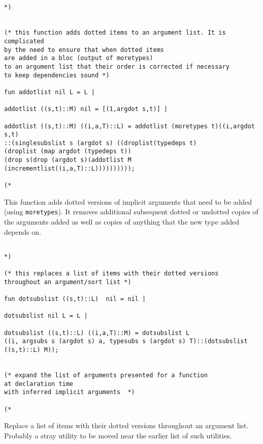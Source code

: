\documentclass{article}
\begin{document}
\begin{verbatim}


*)


(* this function adds dotted items to an argument list. It is complicated
by the need to ensure that when dotted items 
are added in a bloc (output of moretypes)
to an argument list that their order is corrected if necessary 
to keep dependencies sound *)

fun addotlist nil L = L |

addotlist ((s,t)::M) nil = [(1,argdot s,t)] |

addotlist ((s,t)::M) ((i,a,T)::L) = addotlist (moretypes t)((i,argdot s,t)
::(singlesubslist s (argdot s) ((droplist(typedeps t)
(droplist (map argdot (typedeps t)) 
(drop s(drop (argdot s)(addotlist M (incrementlist((i,a,T)::L))))))))));

(*

\end{verbatim}

This function adds dotted versions of implicit arguments that need to be added (using {\tt moretypes}).  It removes additional subsequent dotted or undotted copies of the arguments added as well as copies of
anything that the new type added depends on.

\begin{verbatim}

*)

(* this replaces a list of items with their dotted versions 
throughout an argument/sort list *)

fun dotsubslist ((s,t)::L)  nil = nil |

dotsubslist nil L = L |

dotsubslist ((s,t)::L) ((i,a,T)::M) = dotsubslist L 
((i, argsubs s (argdot s) a, typesubs s (argdot s) T)::(dotsubslist ((s,t)::L) M));


(* expand the list of arguments presented for a function
at declaration time
with inferred implicit arguments  *)

(*

\end{verbatim}

Replace a list of items with their dotted versions throughout an argument list.  Probably a stray utility to be moved near the earlier list of such utilities.
\end{document}

